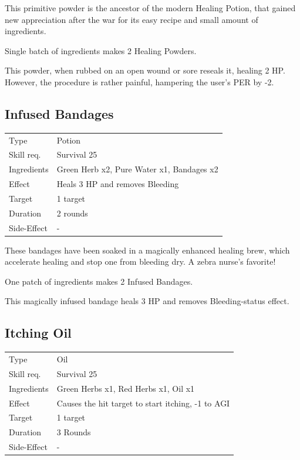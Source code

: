 \documentclass[11pt,a4paper,twocolumn]{book}
\begin{document}
\medskip

This primitive powder is the ancestor of the modern Healing Potion, that gained new appreciation after the war for its easy recipe and small amount of ingredients.

Single batch of ingredients makes 2 Healing Powders.

This powder, when rubbed on an open wound or sore reseals it, healing 2 HP. However, the procedure is rather painful, hampering the user's PER by -2.


\subsection*{Infused Bandages}
{
	\begin{tabu} to 75mm{| X[l,4] | X[l,8] |}
		\hline
		Type 			& Potion 													\\
        Skill req.	    & Survival 25 												\\
        Ingredients     & Green Herb x2, Pure Water x1, Bandages x2					\\
        Effect     		& Heals 3 HP and removes Bleeding 							\\
        Target      	& 1 target													\\
        Duration  		& 2 rounds	 												\\
        Side-Effect     & -															\\ \hline
	\end{tabu}
		
}

\medskip

These bandages have been soaked in a magically enhanced healing brew, which accelerate healing and stop one from bleeding dry. A zebra nurse's favorite!

One patch of ingredients makes 2 Infused Bandages.

This magically infused bandage heals 3 HP and removes Bleeding-status effect.

\vfill

\subsection*{Itching Oil}
{
	\begin{tabu} to 75mm{| X[l,4] | X[l,8] |}
		\hline
		Type 			& Oil 														\\
        Skill req.	    & Survival 25 												\\
        Ingredients     & Green Herbs x1, Red Herbs x1, Oil x1						\\
        Effect     		& Causes the hit target to start itching, -1 to AGI 		\\
        Target      	& 1 target													\\
        Duration  		& 3 Rounds	 												\\
        Side-Effect     & -															\\ \hline
	\end{tabu}
		
}
\end{document}
